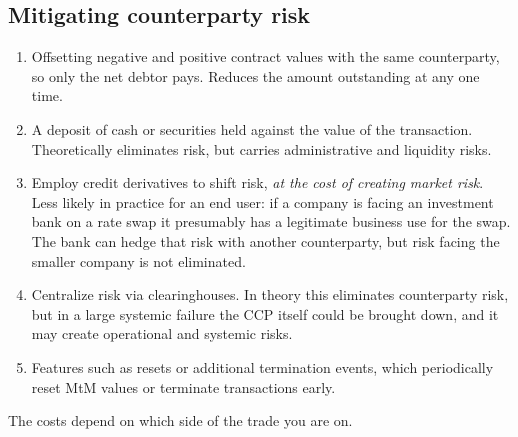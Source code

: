 \subsection*{Mitigating counterparty risk}

\begin{enumerate}
\item {} Offsetting negative and positive contract values with the
same counterparty, so only the net debtor pays. Reduces the amount outstanding at
any one time.
\item {} A deposit of cash or securities held against the value of
the transaction. Theoretically eliminates risk, but carries administrative and
liquidity risks.
\item {} Employ credit derivatives to shift risk, \emph{at the cost
of creating market risk}. Less likely in practice for an end user: if a company is
facing an investment bank on a rate swap it presumably has a legitimate business
use for the swap. The bank can hedge that risk with another counterparty, but risk
facing the smaller company is not eliminated.
\item {} Centralize risk via clearinghouses. In
theory this eliminates counterparty risk, but in a large systemic failure the CCP
itself could be brought down, and it may create operational and systemic risks.
\item {} Features such as resets or additional termination
events, which periodically reset MtM values or terminate transactions early.
\end{enumerate}


The costs depend on which side of the trade you are on.

